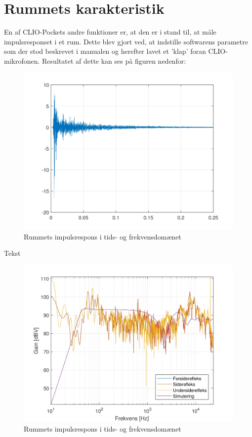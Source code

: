 \newpage
\section{Rummets karakteristik}
En af CLIO-Pockets andre funktioner er, at den er i stand til, at måle impulsresponset i et rum. Dette blev gjort ved, at indstille softwarens parametre som der stod beskrevet i manualen og herefter lavet et 'klap' foran CLIO-mikrofonen. Resultatet af dette kan ses på figuren nedenfor:
\begin{figure}[H]
	\centering
	\vspace{-12pt}
	\includegraphics[width=\textwidth]{Billeder/Grafer/ImpulsResponse}
	\caption{Rummets impulsrespons i tids- og frekvensdomænet}
\end{figure}

\newpage
Tekst
\begin{figure}[H]
	\centering
	\vspace{-12pt}
	\includegraphics[width=\textwidth]{Billeder/Grafer/RealDirect}
	\caption{Rummets impulsrespons i tids- og frekvensdomænet}
\end{figure}

